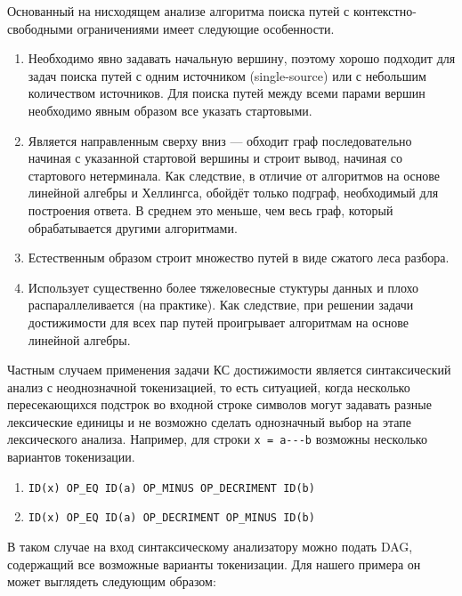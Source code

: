 Основанный на нисходящем анализе алгоритма поиска путей с контекстно-свободными ограничениями имеет следующие особенности.
\begin{enumerate}
  \item Необходимо явно задавать начальную вершину, поэтому хорошо подходит для задач поиска путей с одним источником (single-source) или с небольшим количеством источников. Для поиска путей между всеми парами вершин необходимо явным образом все указать стартовыми.
  \item Является направленным сверху вниз --- обходит граф последовательно начиная с указанной стартовой вершины и строит вывод, начиная со стартового нетерминала. Как следствие, в отличие от алгоритмов на основе линейной алгебры и Хеллингса, обойдёт только подграф, необходимый для построения ответа. В среднем это меньше, чем весь граф, который обрабатывается другими алгоритмами.
  \item Естественным образом строит множество путей в виде сжатого леса разбора.
  \item Использует существенно более тяжеловесные стуктуры данных и плохо распараллеливается (на практике). Как следствие, при решении задачи достижимости для всех пар путей проигрывает алгоритмам на основе линейной алгебры.
\end{enumerate}

Частным случаем применения задачи КС достижимости является синтаксический анализ с неоднозначной токенизацией, то есть ситуацией, когда несколько пересекающихся подстрок во входной строке символов могут задавать разные лексические единицы и не возможно сделать однозначный выбор на этапе лексического анализа.
Например, для строки \verb|x = a---b| возможны несколько вариантов токенизации.
\begin{enumerate}
  \item \verb|ID(x) OP_EQ ID(a) OP_MINUS OP_DECRIMENT ID(b)|
  \item \verb|ID(x) OP_EQ ID(a) OP_DECRIMENT OP_MINUS ID(b)|
\end{enumerate}

В таком случае на вход синтаксическому анализатору можно подать DAG, содержащий все возможные варианты токенизации. Для нашего примера он может выглядеть следующим образом:

